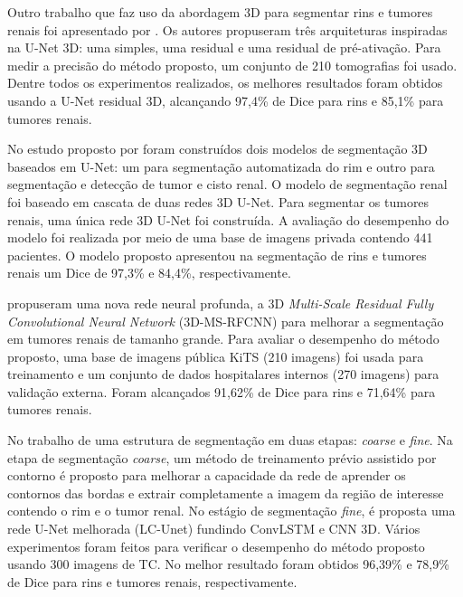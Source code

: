 Outro trabalho que faz uso da abordagem 3D para segmentar rins e tumores renais foi apresentado por . Os autores propuseram três arquiteturas inspiradas na U-Net 3D: uma simples, uma residual e uma residual de pré-ativação. Para medir a precisão do método proposto, um conjunto de 210 tomografias foi usado. Dentre todos os experimentos realizados, os melhores resultados foram obtidos usando a U-Net residual 3D, alcançando 97,4\% de Dice para rins e 85,1\% para tumores renais.

No estudo proposto por  foram construídos dois modelos de segmentação 3D baseados em U-Net: um para segmentação automatizada do rim e outro para segmentação e detecção de tumor e cisto renal. O modelo de segmentação renal foi baseado em cascata de duas redes 3D U-Net. Para segmentar os tumores renais, uma única rede 3D U-Net foi construída. A avaliação do desempenho do modelo foi realizada por meio de uma base de imagens privada contendo 441 pacientes. O modelo proposto apresentou na segmentação de rins e tumores renais um Dice de 97,3\% e 84,4\%, respectivamente.

 propuseram uma nova rede neural profunda, a 3D \textit{Multi-Scale Residual Fully Convolutional Neural Network} (3D-MS-RFCNN) para melhorar a segmentação em tumores renais de tamanho grande. Para avaliar o desempenho do método proposto, uma base de imagens pública KiTS (210 imagens) foi usada para treinamento e um conjunto de dados hospitalares internos (270 imagens) para validação externa. Foram alcançados 91,62\% de Dice para rins e 71,64\% para tumores renais.

No trabalho de  uma estrutura de segmentação em duas etapas: \textit{coarse} e \textit{fine}. Na etapa de segmentação \textit{coarse}, um método de treinamento prévio assistido por contorno é proposto para melhorar a capacidade da rede de aprender os contornos das bordas e extrair completamente a imagem da região de interesse contendo o rim e o tumor renal. No estágio de segmentação \textit{fine}, é proposta uma rede U-Net melhorada (LC-Unet) fundindo ConvLSTM e CNN 3D. Vários experimentos foram feitos para verificar o desempenho do método proposto usando 300 imagens de TC. No melhor resultado foram obtidos 96,39\% e 78,9\% de Dice para rins e tumores renais, respectivamente.

